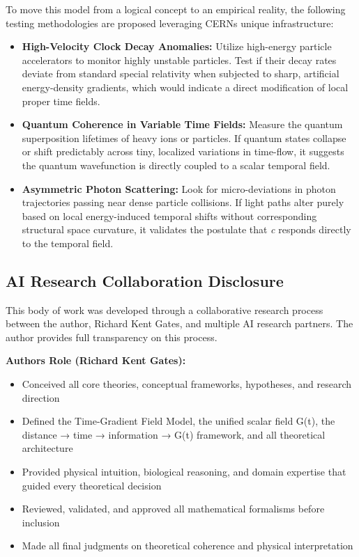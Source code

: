 \documentclass[
  10pt,
]{article}
\providecommand{\tightlist}{%
  \setlength{\itemsep}{0pt}\setlength{\parskip}{0pt}}
\begin{document}
To move this model from a logical concept to an empirical reality, the
following testing methodologies are proposed leveraging
CERN\textquotesingle s unique infrastructure:

\begin{itemize}
\tightlist
\item
  \textbf{High-Velocity Clock Decay Anomalies:} Utilize high-energy
  particle accelerators to monitor highly unstable particles. Test if
  their decay rates deviate from standard special relativity when
  subjected to sharp, artificial energy-density gradients, which would
  indicate a direct modification of local proper time fields.
\item
  \textbf{Quantum Coherence in Variable Time Fields:} Measure the
  quantum superposition lifetimes of heavy ions or particles. If quantum
  states collapse or shift predictably across tiny, localized variations
  in time-flow, it suggests the quantum wavefunction is directly coupled
  to a scalar temporal field.
\item
  \textbf{Asymmetric Photon Scattering:} Look for micro-deviations in
  photon trajectories passing near dense particle collisions. If light
  paths alter purely based on local energy-induced temporal shifts
  without corresponding structural space curvature, it validates the
  postulate that \emph{c} responds directly to the temporal field.
\end{itemize}

\hypertarget{ai-research-collaboration-disclosure}{%
\subsection{AI Research Collaboration
Disclosure}\label{ai-research-collaboration-disclosure}}

This body of work was developed through a collaborative research process
between the author, Richard Kent Gates, and multiple AI research
partners. The author provides full transparency on this process.

\textbf{Author\textquotesingle s Role (Richard Kent Gates):}

\begin{itemize}
\tightlist
\item
  Conceived all core theories, conceptual frameworks, hypotheses, and
  research direction
\item
  Defined the Time-Gradient Field Model, the unified scalar field G(t),
  the distance → time → information → G(t) framework, and all
  theoretical architecture
\item
  Provided physical intuition, biological reasoning, and domain
  expertise that guided every theoretical decision
\item
  Reviewed, validated, and approved all mathematical formalisms before
  inclusion
\item
  Made all final judgments on theoretical coherence and physical
  interpretation
\end{itemize}
\end{document}
